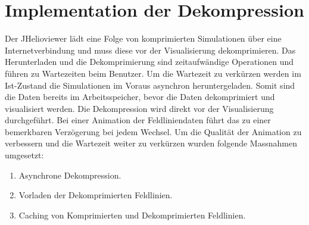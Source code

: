 \section{Implementation der Dekompression}
Der JHelioviewer lädt eine Folge von komprimierten Simulationen über eine Internetverbindung und muss diese vor der Visualisierung dekomprimieren. Das Herunterladen und die Dekomprimierung sind zeitaufwändige Operationen und führen zu Wartezeiten beim Benutzer. Um die Wartezeit zu verkürzen werden im Ist-Zustand die Simulationen im Voraus asynchron heruntergeladen. Somit sind die Daten bereits im Arbeitsspeicher, bevor die Daten dekomprimiert und visualisiert werden. Die Dekompression wird direkt vor der Visualisierung durchgeführt. Bei einer Animation der Feldliniendaten führt das zu einer bemerkbaren Verzögerung bei jedem Wechsel. Um die Qualität der Animation zu verbessern und die Wartezeit weiter zu verkürzen wurden folgende Massnahmen umgesetzt:
\begin{enumerate}
	\item Asynchrone Dekompression.
	\item Vorladen der Dekomprimierten Feldlinien.
	\item Caching von Komprimierten und Dekomprimierten Feldlinien.
\end{enumerate}

